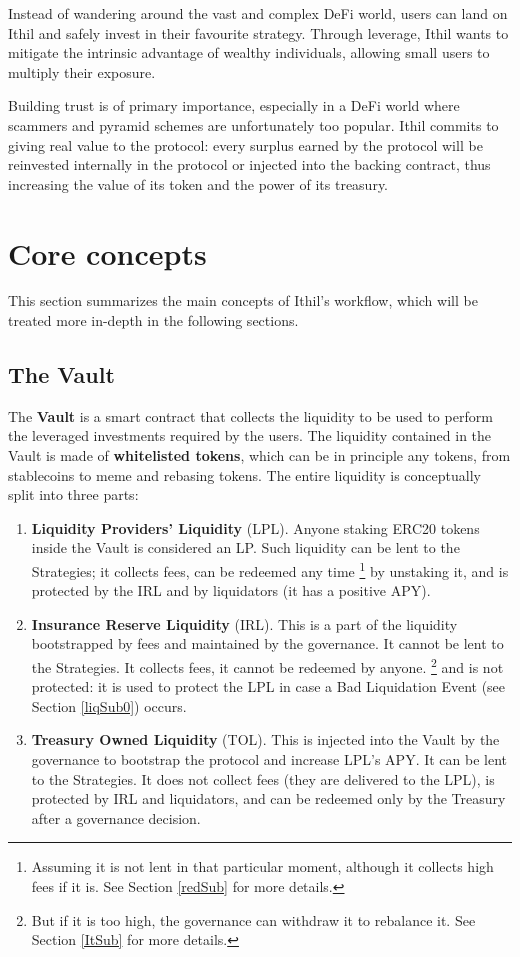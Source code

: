 \documentclass[a4paper,10 pt]{article}
\theoremstyle{definition}
\begin{document}
Instead of wandering around the vast and complex DeFi world, users can land on Ithil and safely invest in their favourite strategy. Through leverage, Ithil wants to mitigate the intrinsic advantage of wealthy individuals, allowing small users to multiply their exposure.

Building trust is of primary importance, especially in a DeFi world where scammers and pyramid schemes are unfortunately too popular. Ithil commits to giving real value to the protocol: every surplus earned by the protocol will be reinvested internally in the protocol or injected into the backing contract, thus increasing the value of its token and the power of its treasury. 

\section{Core concepts}\label{coreSec}
This section summarizes the main concepts of Ithil's workflow, which will be treated more in-depth in the following sections. 
\subsection{The Vault}\label{vaultSub}
The {\bf Vault} is a smart contract that collects the liquidity to be used to perform the leveraged investments required by the users. The liquidity contained in the Vault is made of {\bf whitelisted tokens}, which can be in principle any tokens, from stablecoins to meme and rebasing tokens. The entire liquidity is conceptually split into three parts:
\begin{enumerate}
\item {\bf Liquidity Providers' Liquidity} (LPL). Anyone staking ERC20 tokens inside the Vault is considered an LP. Such liquidity can be lent to the Strategies; it collects fees, can be redeemed any time \footnote{Assuming it is not lent in that particular moment, although it collects high fees if it is. See Section \ref{redSub} for more details.} by unstaking it, and is protected by the IRL and by liquidators (it has a positive APY).
\item {\bf Insurance Reserve Liquidity} (IRL). This is a part of the liquidity bootstrapped by fees and maintained by the governance. It cannot be lent to the Strategies. It collects fees, it cannot be redeemed by anyone. \footnote{But if it is too high, the governance can withdraw it to rebalance it. See Section \ref{ItSub} for more details.} and is not protected: it is used to protect the LPL in case a Bad Liquidation Event (see Section \ref{liqSub0}) occurs.
\item {\bf Treasury Owned Liquidity} (TOL). This is injected into the Vault by the governance to bootstrap the protocol and increase LPL's APY. It can be lent to the Strategies. It does not collect fees (they are delivered to the LPL), is protected by IRL and liquidators, and can be redeemed only by the Treasury after a governance decision.
\end{enumerate}
\end{document}
